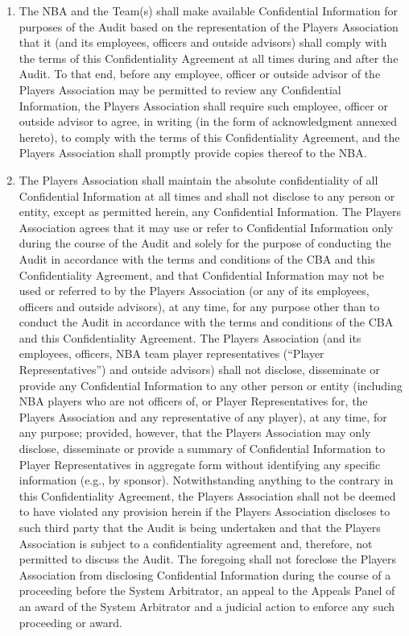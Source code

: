 \documentclass[
]{book}
\begin{document}
\begin{enumerate}
\def\labelenumi{\arabic{enumi}.}
\item
  The NBA and the Team(s) shall make available Confidential Information for purposes of the Audit based on the representation of the Players Association that it (and its employees, officers and outside advisors) shall comply with the terms of this Confidentiality Agreement at all times during and after the Audit. To that end, before any employee, officer or outside advisor of the Players Association may be permitted to review any Confidential Information, the Players Association shall require such employee, officer or outside advisor to agree, in writing (in the form of acknowledgment annexed hereto), to comply with the terms of this Confidentiality Agreement, and the Players Association shall promptly provide copies thereof to the NBA.
\item
  The Players Association shall maintain the absolute confidentiality of all Confidential Information at all times and shall not disclose to any person or entity, except as permitted herein, any Confidential Information. The Players Association agrees that it may use or refer to Confidential Information only during the course of the Audit and solely for the purpose of conducting the Audit in accordance with the terms and conditions of the CBA and this Confidentiality Agreement, and that Confidential Information may not be used or referred to by the Players Association (or any of its employees, officers and outside advisors), at any time, for any purpose other than to conduct the Audit in accordance with the terms and conditions of the CBA and this Confidentiality Agreement. The Players Association (and its employees, officers, NBA team player representatives (``Player Representatives'') and outside advisors) shall not disclose, disseminate or provide any Confidential Information to any other person or entity (including NBA players who are not officers of, or Player Representatives for, the Players Association and any representative of any player), at any time, for any purpose; provided, however, that the Players Association may only disclose, disseminate or provide a summary of Confidential Information to Player Representatives in aggregate form without identifying any specific information (e.g., by sponsor). Notwithstanding anything to the contrary in this Confidentiality Agreement, the Players Association shall not be deemed to have violated any provision herein if the Players Association discloses to such third party that the Audit is being undertaken and that the Players Association is subject to a confidentiality agreement and, therefore, not permitted to discuss the Audit. The foregoing shall not foreclose the Players Association from disclosing Confidential Information during the course of a proceeding before the System Arbitrator, an appeal to the Appeals Panel of an award of the System Arbitrator and a judicial action to enforce any such proceeding or award.

\end{enumerate}
\end{document}
